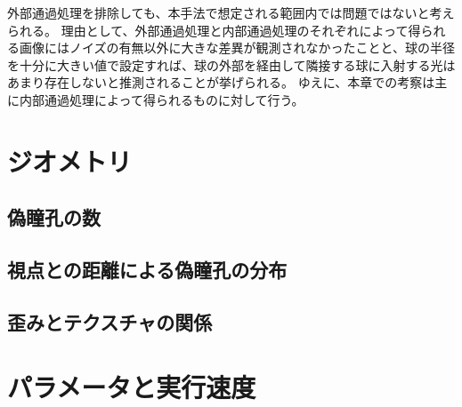 外部通過処理を排除しても、本手法で想定される範囲内では問題ではないと考えられる。
理由として、外部通過処理と内部通過処理のそれぞれによって得られる画像にはノイズの有無以外に大きな差異が観測されなかったことと、球の半径を十分に大きい値で設定すれば、球の外部を経由して隣接する球に入射する光はあまり存在しないと推測されることが挙げられる。
ゆえに、本章での考察は主に内部通過処理によって得られるものに対して行う。


\section{ジオメトリ}
\label{S}

\subsection{偽瞳孔の数}
\label{SS}

\subsection{視点との距離による偽瞳孔の分布}
\label{SS}

\subsection{歪みとテクスチャの関係}
\label{SS}


\section{パラメータと実行速度}
\label{SParameterAndExeTime}

